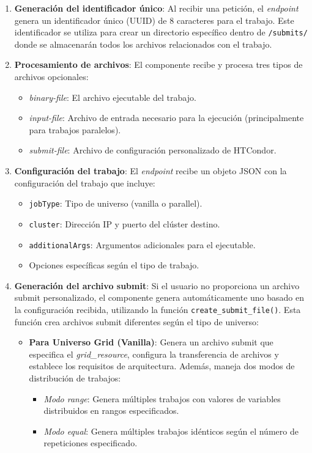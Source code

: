 \begin{enumerate}
	\item \textbf{Generación del identificador único}: Al recibir una petición, el \textit{endpoint} genera un identificador único (UUID) de 8 caracteres para el trabajo. Este identificador se utiliza para crear un directorio específico dentro de \texttt{/submits/} donde se almacenarán todos los archivos relacionados con el trabajo.

	\item \textbf{Procesamiento de archivos}: El componente recibe y procesa tres tipos de archivos opcionales:
	      \begin{itemize}
		      \item \textit{binary-file}: El archivo ejecutable del trabajo.
		      \item \textit{input-file}: Archivo de entrada necesario para la ejecución (principalmente para trabajos paralelos).
		      \item \textit{submit-file}: Archivo de configuración personalizado de HTCondor.
	      \end{itemize}

	\item \textbf{Configuración del trabajo}: El \textit{endpoint} recibe un objeto JSON con la configuración del trabajo que incluye:
	      \begin{itemize}
		      \item \texttt{jobType}: Tipo de universo (vanilla o parallel).
		      \item \texttt{cluster}: Dirección IP y puerto del clúster destino.
		      \item \texttt{additionalArgs}: Argumentos adicionales para el ejecutable.
		      \item Opciones específicas según el tipo de trabajo.
	      \end{itemize}

	\item \textbf{Generación del archivo submit}: Si el usuario no proporciona un archivo submit personalizado, el componente genera automáticamente uno basado en la configuración recibida, utilizando la función \texttt{create\_submit\_file()}. Esta función crea archivos submit diferentes según el tipo de universo:

	      \begin{itemize}
		      \item \textbf{Para Universo Grid (Vanilla)}: Genera un archivo submit que especifica el \textit{grid\_resource}, configura la transferencia de archivos y establece los requisitos de arquitectura. Además, maneja dos modos de distribución de trabajos:
		            \begin{itemize}
			            \item \textit{Modo range}: Genera múltiples trabajos con valores de variables distribuidos en rangos especificados.
			            \item \textit{Modo equal}: Genera múltiples trabajos idénticos según el número de repeticiones especificado.
		            \end{itemize}


\end{itemize}
\end{enumerate}
